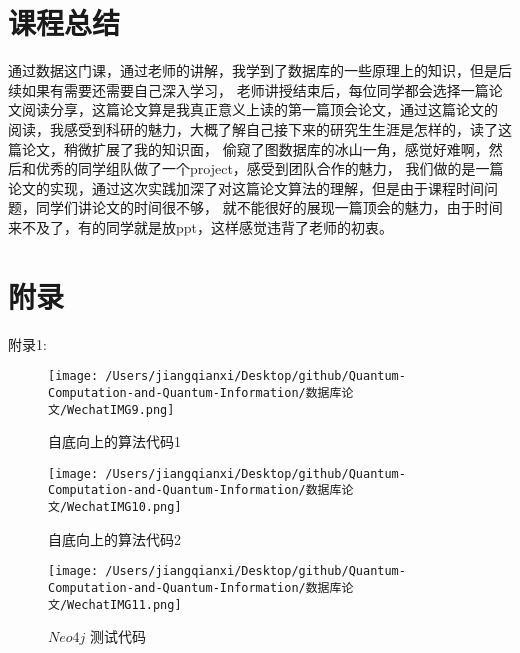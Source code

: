 \documentclass[UTF8]{ctexart}
\begin{document}
\section{课程总结}
\par{
	通过数据这门课，通过老师的讲解，我学到了数据库的一些原理上的知识，但是后续如果有需要还需要自己深入学习，
	老师讲授结束后，每位同学都会选择一篇论文阅读分享，这篇论文算是我真正意义上读的第一篇顶会论文，通过这篇论文的
	阅读，我感受到科研的魅力，大概了解自己接下来的研究生生涯是怎样的，读了这篇论文，稍微扩展了我的知识面，
	偷窥了图数据库的冰山一角，感觉好难啊，然后和优秀的同学组队做了一个project，感受到团队合作的魅力，
	我们做的是一篇论文的实现，通过这次实践加深了对这篇论文算法的理解，但是由于课程时间问题，同学们讲论文的时间很不够，
	就不能很好的展现一篇顶会的魅力，由于时间来不及了，有的同学就是放ppt，这样感觉违背了老师的初衷。
}
\section{附录}
\par{
	附录1:
	\begin{figure}[h]
		\centering
		\texttt{[image: /Users/jiangqianxi/Desktop/github/Quantum-Computation-and-Quantum-Information/数据库论文/WechatIMG9.png]}
		\caption{自底向上的算法代码1}
	\end{figure}
	\begin{figure}[h]
			\centering
			\texttt{[image: /Users/jiangqianxi/Desktop/github/Quantum-Computation-and-Quantum-Information/数据库论文/WechatIMG10.png]}
			\caption{自底向上的算法代码2}
	\end{figure}
\begin{figure}[h]
	\centering
	\texttt{[image: /Users/jiangqianxi/Desktop/github/Quantum-Computation-and-Quantum-Information/数据库论文/WechatIMG11.png]}
	\caption{$Neo4j$ 测试代码}
\end{figure}
}



\end{document}
